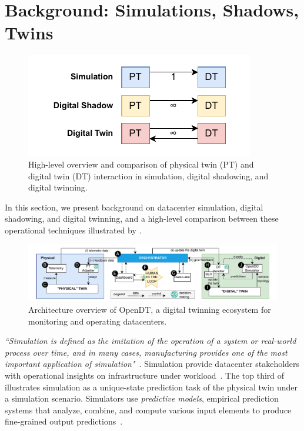\section{Background: Simulations, Shadows, Twins}\label{sec:background}

\begin{figure}
    \centering
    \includegraphics[width=0.75\linewidth]{report/figures/background.pdf}
    \caption{High-level overview and comparison of physical twin (PT) and digital twin (DT) interaction in simulation, digital shadowing, and digital twinning.}
    \label{fig:background}
\end{figure}

In this section, we present background on datacenter simulation, digital shadowing, and digital twinning, and a high-level comparison between these operational techniques illustrated by .

\begin{figure}[h]
    \centering
    \hspace*{-0.55cm}\includegraphics[width=1.05\linewidth]{report/figures/opendt-design.pdf} 
    \caption{Architecture overview of OpenDT, a digital twinning ecosystem for monitoring and operating datacenters.}
    \label{fig:opendt-design}
\end{figure}

\textit{``Simulation is defined as the imitation of the operation of a system or real-world process over time, and in many cases, manufacturing provides one of the most important application of simulation"}~\cite{DBLP:conf/wsc/LeeMS03, nicolae5377101m3sa}. Simulation provide datacenter stakeholders with operational insights on infrastructure under workload~\cite{nicolae5377101m3sa}. The top third of~ illustrates simulation as a unique-state prediction task of the physical twin under a simulation scenario. Simulators use \textit{predictive models}, empirical prediction systems that analyze, combine, and compute various input elements to produce fine-grained output predictions~\cite{modsim:book/ZaraiN15:orig, nicolae5377101m3sa}.

